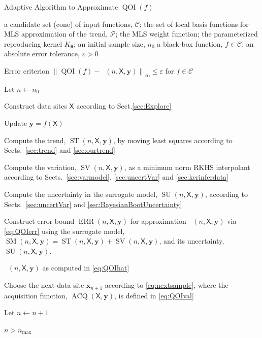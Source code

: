 \documentclass[11pt]{NSFamsart}
\DeclareMathOperator{\QOI}{QOI} %
\DeclareMathOperator{\APP}{\widehat{\QOI}}
\DeclareMathOperator{\SURR}{SM} %
\DeclareMathOperator{\STREND}{ST} %
\DeclareMathOperator{\SVAR}{SV} %
\DeclareMathOperator{\ERR}{ERR}
\DeclareMathOperator{\VAL}{ACQ}
\DeclareMathOperator{\SURRERR}{SU}
\newcommand{\mX}{\mathsf{X}}
\newcommand{\bx}{{\boldsymbol{x}}}
\newcommand{\by}{{\boldsymbol{y}}}
\newcommand{\btheta}{{\boldsymbol{\theta}}}
\newcommand{\cc}{\mathcal{C}}
\newcommand{\cP}{\mathcal{P}}
\newcommand{\bignorm}[2][{}]{\ensuremath{\bigl \lVert #2 \bigr \rVert}_{#1}}
\begin{document}
\begin{algorithm}
	\caption{Adaptive Algorithm to Approximate $\QOI(f)$ \label{alg:algframe}}
	\begin{algorithmic}
		\PARAM a candidate set (cone) of input functions, $\cc$; the set of local basis functions for MLS approximation of the trend, $\cP$; the MLS weight function; the parameterized reproducing kernel  $K_{\btheta}$; an initial sample size, $n_0$
		\INPUT a black-box function, $f \in \cc$; an absolute error tolerance, $\varepsilon>0$
		
		\Ensure Error criterion $\bignorm[\infty]{\QOI(f) - \APP(n,\mX,\by)} \le \varepsilon$  for $f \in \cc$
		
		\State Let $n \leftarrow n_0$
		
		\State Construct data sites $\mX$ according to Sect.\ref{sec:Explore}  
		
		\Repeat {}
		
		\State Update $\by = f(\mX)$
		
		\State Compute the  trend, $\STREND(n,\mX,\by)$, by moving least squares according to Sects.\ \ref{sec:trend} and \ref{sec:ourtrend}
		
		\State Compute the variation, $\SVAR(n,\mX,\by)$, as a minimum norm RKHS interpolant according to Sects.\ \ref{sec:varmodel}, \ref{sec:uncertVar} and \ref{sec:kerinferdata}
		
		\State Compute the  uncertainty in the surrogate model, $\SURRERR(n,\mX,\by)$, according to Sects.\ \ref{sec:uncertVar} and \ref{sec:BayesianBootUncertainty}
		
		\State Construct error bound $\ERR(n,\mX,\by)$ for approximation $\APP(n,\mX,\by)$ via \eqref{eq:QOIerr} using the surrogate model, $\SURR(n,\mX,\by) = \STREND(n,\mX,\by) + \SVAR(n,\mX,\by)$, and its uncertainty, $\SURRERR(n,\mX,\by)$.
		
		\If{$\ERR(n,\mX,\by) \le \varepsilon$}
		
		\RETURN $\APP(n,\mX,\by)$ as computed in \eqref{eq:QOIhat}
		
		\EndIf
				
		\State Choose the next data site $\bx_{n+1}$ according to \eqref{eq:nextsample}, where the acquisition function, $\VAL(\mX,\by)$, is defined in \eqref{eq:QOIval}
		
		\State Let $n \leftarrow n + 1$

		\Until $n > n_{\max}$
				
	\end{algorithmic}
\end{algorithm}
\end{document}
